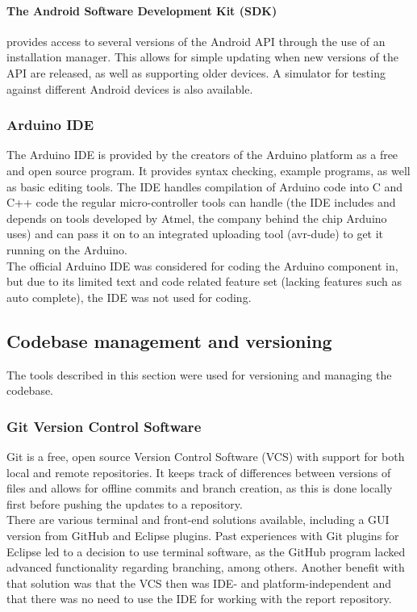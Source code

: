 \paragraph{The Android Software Development Kit (SDK)}
provides access to several versions of the Android API through the use of an installation manager. This allows for simple updating when new versions of the API are released, as well as supporting older devices. A simulator for testing against different Android devices is also available.

\subsubsection{Arduino IDE}
The Arduino IDE is provided by the creators of the Arduino platform as a free and open source program. It provides syntax checking, example programs, as well as basic editing tools. The IDE handles compilation of Arduino code into C and C++ code the regular micro-controller tools can handle (the IDE includes and depends on tools developed by Atmel, the company behind the chip Arduino uses) and can pass it on to an integrated uploading tool (avr-dude) to get it running on the Arduino.\\
\newline
The official Arduino IDE was considered for coding the Arduino component in, but due to its limited text and code related feature set (lacking features such as auto complete), the IDE was not used for coding.

\subsection{Codebase management and versioning}
The tools described in this section were used for versioning and managing the codebase.

\subsubsection{Git Version Control Software}
Git is a free, open source Version Control Software (VCS) with support for both local and remote repositories. It keeps track of differences between versions of files and allows for offline commits and branch creation, as this is done locally first before pushing the updates to a repository.\\
\newline
There are various terminal and front-end solutions available, including a GUI version from GitHub and Eclipse plugins. Past experiences with Git plugins for Eclipse led to a decision to use terminal software, as the GitHub program lacked advanced functionality regarding branching, among others. Another benefit with that solution was that the VCS then was IDE- and platform-independent and that there was no need to use the IDE for working with the report repository.

